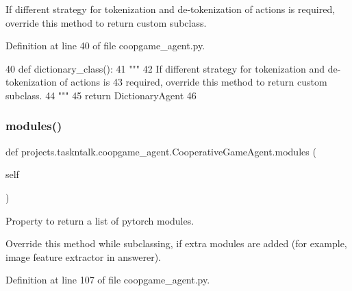 \begin{DoxyVerb}If different strategy for tokenization and de-tokenization of actions is
required, override this method to return custom subclass.
\end{DoxyVerb}
 

Definition at line 40 of file coopgame\+\_\+agent.\+py.


\begin{DoxyCode}
40     \textcolor{keyword}{def }dictionary\_class():
41         \textcolor{stringliteral}{"""}
42 \textcolor{stringliteral}{        If different strategy for tokenization and de-tokenization of actions is}
43 \textcolor{stringliteral}{        required, override this method to return custom subclass.}
44 \textcolor{stringliteral}{        """}
45         \textcolor{keywordflow}{return} DictionaryAgent
46 
\end{DoxyCode}
\mbox{\label{classprojects_1_1taskntalk_1_1coopgame__agent_1_1CooperativeGameAgent_afe7b621baea1c0bbc86fb5c815428c63}} 
\subsubsection{\texorpdfstring{modules()}{modules()}}
{\footnotesize\ttfamily def projects.\+taskntalk.\+coopgame\+\_\+agent.\+Cooperative\+Game\+Agent.\+modules (\begin{DoxyParamCaption}\item[{}]{self }\end{DoxyParamCaption})}

\begin{DoxyVerb}Property to return a list of pytorch modules.

Override this method while subclassing, if extra modules are added (for example,
image feature extractor in answerer).
\end{DoxyVerb}
 

Definition at line 107 of file coopgame\+\_\+agent.\+py.


